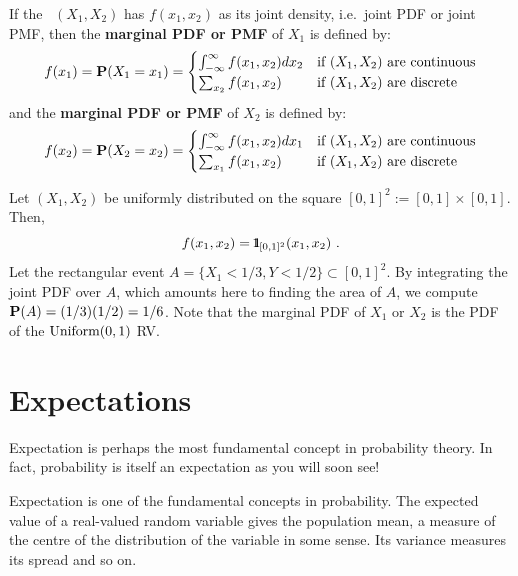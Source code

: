 {\begin{definition}
If the \rv~$(X_1,X_2)$ has $f(x_1,x_2)$ as its joint density, i.e.~joint PDF or joint PMF, then the {\bf marginal PDF or PMF} of $X_1$ is defined by:
\[
f(x_1) = \mathbf{P}(X_1=x_1) =
\begin{cases}
\int_{-\infty}^{\infty} f(x_1,x_2) dx_2 & \text{if $(X_1,X_2)$ are continuous}  \\
\sum_{x_2} f(x_1,x_2) & \text{if $(X_1,X_2)$ are discrete} \\
\end{cases}
\]
and the  {\bf marginal PDF or PMF} of $X_2$ is defined by:
\[
f(x_2) = \mathbf{P}(X_2=x_2) =
\begin{cases}
\int_{-\infty}^{\infty} f(x_1,x_2) dx_1 & \text{if $(X_1,X_2)$ are continuous}  \\
\sum_{x_1} f(x_1,x_2) & \text{if $(X_1,X_2)$ are discrete} \\
\end{cases}
\]
\end{definition}

\begin{example}  Let $(X_1,X_2)$ be uniformly distributed on the square $[0,1]^2 := [0,1] \times [0,1]$.  Then,
\[
f(x_1,x_2) = {1}\mspace{-11 mu}{1}_{[0,1]^2}(x_1,x_2) \ .
\]
Let the rectangular event $A=\{X_1 < 1/3, Y < 1/2 \} \subset [0,1]^2$.  By integrating the joint PDF over $A$, which amounts here to finding the area of $A$, we compute $\mathbf{P}(A) = (1/3) (1/2) = 1/6$.  Note that the marginal PDF of $X_1$ or $X_2$ is the PDF of the $\mbox{{\rm Uniform}}(0,1)$ RV.
\end{example}

}%



\newpage

\section{Expectations}\label{S:Expectations}

Expectation is perhaps the most fundamental concept in probability theory. In fact, probability is itself an expectation as you will soon see!

Expectation is one of the fundamental concepts in probability.  The
expected value of a real-valued random variable gives the population mean, a measure of the
centre of the distribution of the variable in some sense.  
Its variance measures its spread and so on.

